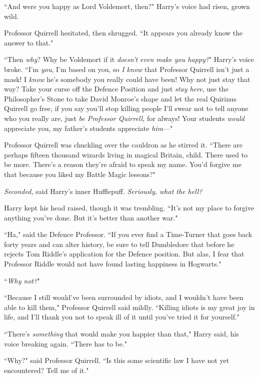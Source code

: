 ``And were you happy as Lord Voldemort, then?" Harry's voice had risen, grown wild.

Professor Quirrell hesitated, then shrugged. ``It appears you already know the answer to that."

``Then \emph{why}? Why be Voldemort if it \emph{doesn't even make you happy?}" Harry's voice broke. ``I'm \emph{you}, I'm based on you, so \emph{I know} that Professor Quirrell isn't just a mask! I \emph{know} he's somebody you really could have been! Why not just stay that way? Take your curse off the Defence Position and just \emph{stay here}, use the Philosopher's Stone to take David Monroe's shape and let the real Quirinus Quirrell go free, if you say you'll stop killing people I'll swear not to tell anyone who you really are, just \emph{be Professor Quirrell,} for always! Your students \emph{would} appreciate you, my father's students appreciate \emph{him}—"

Professor Quirrell was chuckling over the cauldron as he stirred it. ``There are perhaps fifteen thousand wizards living in magical Britain, child. There used to be more. There's a reason they're afraid to speak my name. You'd forgive me that because you liked my Battle Magic lessons?"

\emph{Seconded,} said Harry's inner Hufflepuff. \emph{Seriously, what the hell?}

Harry kept his head raised, though it was trembling. ``It's not my place to forgive anything you've done. But it's better than another war."

``Ha," said the Defence Professor. ``If you ever find a Time-Turner that goes back forty years and can alter history, be sure to tell Dumbledore that before he rejects Tom Riddle's application for the Defence position. But alas, I fear that Professor Riddle would not have found lasting happiness in Hogwarts."

``\emph{Why not?}"

``Because I still would've been surrounded by idiots, and I wouldn't have been able to kill them," Professor Quirrell said mildly. ``Killing idiots is my great joy in life, and I'll thank you not to speak ill of it until you've tried it for yourself."

``There's \emph{something} that would make you happier than that," Harry said, his voice breaking again. ``There has to be."

``Why?" said Professor Quirrell. ``Is this some scientific law I have not yet encountered? Tell me of it."

